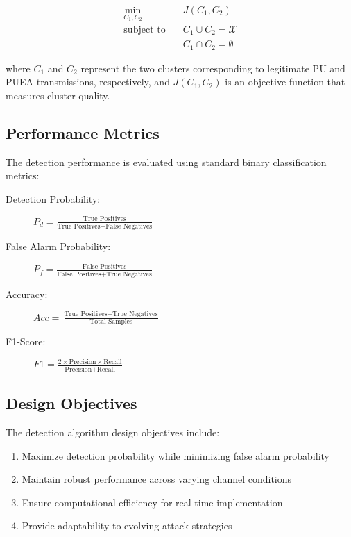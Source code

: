 \begin{align}
\min_{C_1, C_2} &\quad J(C_1, C_2) \\
\text{subject to} &\quad C_1 \cup C_2 = \mathcal{X} \\
&\quad C_1 \cap C_2 = \emptyset
\end{align}

where $C_1$ and $C_2$ represent the two clusters corresponding to legitimate PU and PUEA transmissions, respectively, and $J(C_1, C_2)$ is an objective function that measures cluster quality.

\subsection{Performance Metrics}
The detection performance is evaluated using standard binary classification metrics:

\begin{description}
\item[Detection Probability:] $P_d = \frac{\text{True Positives}}{\text{True Positives} + \text{False Negatives}}$

\item[False Alarm Probability:] $P_f = \frac{\text{False Positives}}{\text{False Positives} + \text{True Negatives}}$

\item[Accuracy:] $Acc = \frac{\text{True Positives} + \text{True Negatives}}{\text{Total Samples}}$

\item[F1-Score:] $F1 = \frac{2 \times \text{Precision} \times \text{Recall}}{\text{Precision} + \text{Recall}}$
\end{description}

\subsection{Design Objectives}
The detection algorithm design objectives include:
\begin{enumerate}
\item Maximize detection probability while minimizing false alarm probability
\item Maintain robust performance across varying channel conditions
\item Ensure computational efficiency for real-time implementation
\item Provide adaptability to evolving attack strategies
\end{enumerate}

